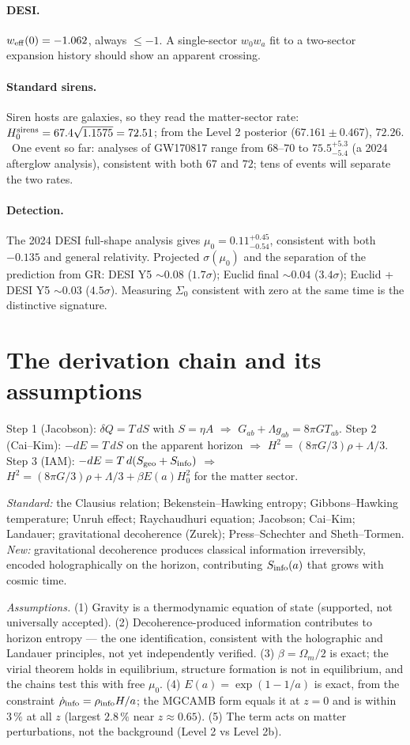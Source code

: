 \paragraph{DESI.} $w_{\rm eff}(0)=-1.062$, always $\le-1$. A single-sector $w_0w_a$ fit to a two-sector expansion history should show an apparent crossing.
\paragraph{Standard sirens.} Siren hosts are galaxies, so they read the matter-sector rate: $H_0^{\rm sirens}=67.4\sqrt{1.1575}=72.51$; from the Level 2 posterior
($67.161\pm0.467$), $72.26$. \calc\ One event so far: analyses of GW170817 range from $68$--$70$ to $75.5^{+5.3}_{-5.4}$ (a 2024 afterglow
analysis), consistent with both $67$ and $72$; tens of events will separate the two rates.
\paragraph{Detection.} The 2024 DESI full-shape analysis gives $\mu_0=0.11^{+0.45}_{-0.54}$, consistent with both $-0.135$ and general relativity.
Projected $\sigma(\mu_0)$ and the separation of the prediction from GR: DESI Y5 $\sim0.08$ ($1.7\sigma$); Euclid final $\sim0.04$ ($3.4\sigma$);
Euclid + DESI Y5 $\sim0.03$ ($4.5\sigma$). Measuring $\Sigma_0$ consistent with zero at the same time is the distinctive signature.

\section{The derivation chain and its assumptions}
Step 1 (Jacobson): $\delta Q=T\,dS$ with $S=\eta A$ $\Rightarrow$ $G_{ab}+\Lambda g_{ab}=8\pi GT_{ab}$.
Step 2 (Cai--Kim): $-dE=T\,dS$ on the apparent horizon $\Rightarrow$ $H^2=(8\pi G/3)\rho+\Lambda/3$.
Step 3 (IAM): $-dE=T\,d(S_{\rm geo}+S_{\rm info})$ $\Rightarrow$ $H^2=(8\pi G/3)\rho+\Lambda/3+\beta E(a)H_0^2$ for the matter sector.

\emph{Standard:} the Clausius relation; Bekenstein--Hawking entropy; Gibbons--Hawking temperature; Unruh effect; Raychaudhuri equation; Jacobson; Cai--Kim;
Landauer; gravitational decoherence (Zurek); Press--Schechter and Sheth--Tormen. \emph{New:} gravitational decoherence produces classical information
irreversibly, encoded holographically on the horizon, contributing $S_{\rm info}(a)$ that grows with cosmic time.

\emph{Assumptions.} (1) Gravity is a thermodynamic equation of state (supported, not universally accepted). (2) Decoherence-produced information
contributes to horizon entropy --- the one identification, consistent with the holographic and Landauer principles, not yet independently verified.
(3) $\beta=\Omega_m/2$ is exact; the virial theorem holds in equilibrium, structure formation is not in equilibrium, and the chains test this with free $\mu_0$.
(4) $E(a)=\exp(1-1/a)$ is exact, from the constraint $\dot\rho_{\rm info}=\rho_{\rm info}H/a$; the MGCAMB form equals it at $z=0$ and is within $3\,\%$ at all $z$ (largest $2.8\,\%$ near $z\approx0.65$).
(5) The term acts on matter perturbations, not the background (Level 2 vs Level 2b).

